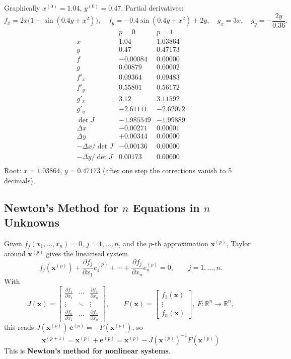\documentclass[hidelinks]{article}
\begin{document}
Graphically $x^{(0)}=1.04$, $y^{(0)}=0.47$. Partial derivatives:
\[
f_x=2x\big(1-\sin(0.4y+x^2)\big),\quad f_y=-0.4\sin(0.4y+x^2)+2y,\quad g_x=3x,\quad g_y=-\frac{2y}{0.36}.
\]
\[
\begin{array}{l|rr}
 & p=0 & p=1\\ \hline
x & 1.04 & 1.03864\\
y & 0.47 & 0.47173\\
f & -0.00084 & 0.00000\\
g & 0.00879 & 0.00002\\
f'_x & 0.09364 & 0.09483\\
f'_y & 0.55801 & 0.56172\\
g'_x & 3.12 & 3.11592\\
g'_y & -2.61111 & -2.62072\\
\det J & -1.985549 & -1.99889\\
\Delta x & -0.00271 & 0.00001\\
\Delta y & +0.00344 & 0.00000\\
-\Delta x/\det J & -0.00136 & 0.00000\\
-\Delta y/\det J & 0.00173 & 0.00000\\
\end{array}
\]
Root: $x=1.03864$, $y=0.47173$ (after one step the corrections vanish to 5 decimals).

\subsection{Newton's Method for $n$ Equations in $n$ Unknowns}

Given $f_j(x_1,\dots,x_n)=0$, $j=1,\dots,n$, and the $p$-th approximation $\mathbf x^{(p)}$, Taylor around $\mathbf x^{(p)}$ gives the linearised system
\[
f_j(\mathbf x^{(p)})+\frac{\partial f_j}{\partial x_1}e_1^{(p)}+\cdots+\frac{\partial f_j}{\partial x_n}e_n^{(p)}=0,\qquad j=1,\dots,n .
\]
With
\[
J(\mathbf x)=\begin{bmatrix}
\frac{\partial f_1}{\partial x_1}&\cdots&\frac{\partial f_1}{\partial x_n}\\
\vdots&\ddots&\vdots\\
\frac{\partial f_n}{\partial x_1}&\cdots&\frac{\partial f_n}{\partial x_n}
\end{bmatrix},\qquad
F(\mathbf x)=\begin{bmatrix}f_1(\mathbf x)\\ \vdots\\ f_n(\mathbf x)\end{bmatrix},\ F:\mathbb R^n\to\mathbb R^n,
\]
this reads $J(\mathbf x^{(p)})\,\mathbf e^{(p)}=-F(\mathbf x^{(p)})$, so
\[
\boxed{\,\mathbf x^{(p+1)}=\mathbf x^{(p)}+\mathbf e^{(p)}=\mathbf x^{(p)}-J(\mathbf x^{(p)})^{-1}F(\mathbf x^{(p)})\,}
\]
This is \textbf{Newton's method for nonlinear systems}.
\end{document}
